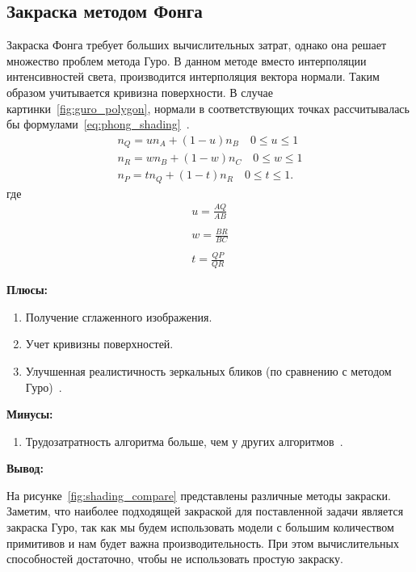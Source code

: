 \subsection{Закраска методом Фонга}
Закраска Фонга требует больших вычислительных затрат, однако она решает множество проблем метода Гуро.
В данном методе вместо интерполяции интенсивностей света, производится интерполяция вектора нормали.
Таким образом учитывается кривизна поверхности.
В случае картинки~\ref{fig:guro_polygon}, нормали в соответствующих точках рассчитывалась бы формулами~\ref{eq:phong_shading}~\cite{Rodgers}.
\begin{equation}
	\label{eq:phong_shading}
	\begin{aligned}
		n_Q = un_A + (1-u)n_B  \quad 0 \leq u \leq 1 \\
		n_R = wn_B + (1-w)n_C  \quad 0 \leq w \leq 1 \\
		n_P = tn_Q + (1-t)n_R  \quad 0 \leq t \leq 1.
	\end{aligned}
\end{equation}
где
\begin{equation}
	\begin{aligned}
		u = \frac{AQ}{AB} \\\\
		w = \frac{BR}{BC} \\\\
		t = \frac{QP}{QR} 
	\end{aligned}
\end{equation}

\newpage

\textbf{Плюсы:}
\begin{enumerate}
	\item Получение сглаженного изображения.
	\item Учет кривизны поверхностей.
	\item Улучшенная реалистичность зеркальных бликов (по сравнению с методом Гуро)~\cite{Rodgers}.
\end{enumerate}

\textbf{Минусы:}
\begin{enumerate} 
	\item Трудозатратность алгоритма больше, чем у других алгоритмов~\cite{Rodgers}.
\end{enumerate}


\textbf{Вывод:}

На рисунке~\ref{fig:shading_compare} представлены различные методы закраски. 
Заметим, что наиболее подходящей закраской для поставленной задачи является закраска Гуро, так как мы будем использовать модели с большим количеством примитивов и нам будет важна производительность. При этом вычислительных способностей достаточно, чтобы не использовать простую закраску.

